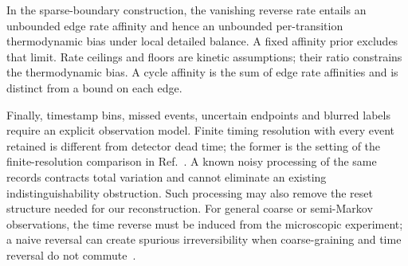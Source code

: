 In the sparse-boundary construction, the vanishing reverse rate entails
an unbounded edge rate affinity and hence an unbounded per-transition
thermodynamic bias under local detailed balance. A fixed affinity prior
excludes that limit. Rate ceilings and floors are kinetic assumptions;
their ratio constrains the thermodynamic bias. A cycle affinity is the
sum of edge rate affinities and is distinct from a bound on each edge.

Finally, timestamp bins, missed events, uncertain endpoints and blurred
labels require an explicit observation model. Finite timing resolution
with every event retained is different from detector dead time; the
former is the setting of the finite-resolution comparison in
Ref.~\cite{FritzErtelSeifert2025}. A known noisy processing of the same
records contracts total variation and cannot eliminate an existing
indistinguishability obstruction. Such processing may also remove the
reset structure needed for our reconstruction. For general coarse or
semi-Markov observations, the time reverse must be induced from the
microscopic experiment; a naive reversal can create spurious
irreversibility when coarse-graining and time reversal do not
commute~\cite{Blom2024,BiskerReply2024}.

